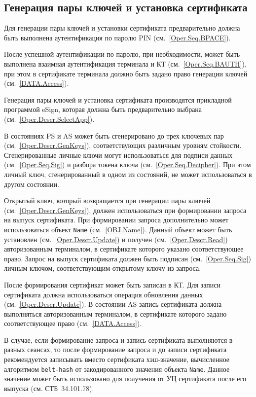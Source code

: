\subsection{Генерация пары ключей и установка сертификата}
\label{Oper.Seq.GeKeySetCert}

Для генерации пары ключей и 
установки сертификата предварительно 
должна быть выполнена аутентификация по 
паролю PIN (см.~\ref{Oper.Seq.BPACE}).

После успешной аутентификации по паролю,
при необходимости, может быть выполнена взаимная 
аутентификация терминала и КТ (см.~\ref{Oper.Seq.BAUTH}),
при этом в сертификате терминала должно быть задано
право генерации ключей (см.~\ref{DATA.Access}).

Генерация пары ключей и установка сертификата производятся
прикладной программой eSign, которая должна быть предварительно 
выбрана (см.~\ref{Oper.Descr.SelectApp}). 

В состояниях PS и AS может быть сгенерировано
до трех ключевых пар (см.~\ref{Oper.Descr.GenKeys}), 
соответствующих различным уровням стойкости. 
Сгенерированные личные ключи могут использоваться
для подписи данных (см.~\ref{Oper.Seq.Sig}) и разбора токена 
ключа (см.~\ref{Oper.Seq.Decipher}).
При этом личный ключ, сгенерированный в одном из состояний, 
не может использоваться в другом состоянии. 

Открытый ключ, который возвращается при генерации пары ключей
(см.~\ref{Oper.Descr.GenKeys}), должен использоваться при формировании 
запроса на выпуск сертификата.
При формировании запроса дополнительно может использоваться 
объект \texttt{Name} (см.~\ref{OBJ.Name}). 
Данный объект может быть установлен (см.~\ref{Oper.Descr.Update}) 
и получен (см.~\ref{Oper.Descr.Read})
авторизованным терминалом, в сертификате которого указано 
соответствующее право.
\fi
Запрос на выпуск сертификата должен быть подписан (см.~\ref{Oper.Seq.Sig})
личным ключом, соответствующим открытому ключу из запроса.

После формирования сертификат может быть записан в КТ.
Для записи сертификата должна использоваться операция 
обновления данных (см.~\ref{Oper.Descr.Update}). 
В состоянии AS запись сертификата должна выполняться 
авторизованным терминалом, в сертификате которого задано 
соответствующее право (см.~\ref{DATA.Access}). 

В случае, если формирование запроса и запись сертификата
выполняются в разных сеансах, то 
после формирование запроса и до записи сертификата 
рекомендуется записывать вместо сертификата 
хэш-значение, вычисленное алгоритмом \texttt{belt-hash} 
от закодированного значения объекта \texttt{Name}.
Данное значение может быть использовано для получения от УЦ
сертификата после его выпуска (см. СТБ~34.101.78).

